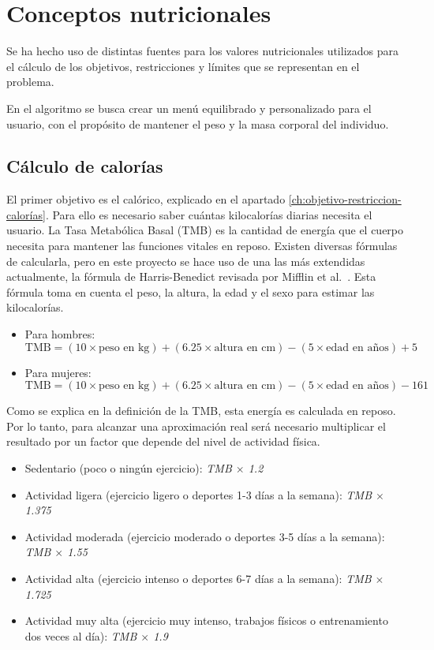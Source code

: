 \section{Conceptos nutricionales}

Se ha hecho uso de distintas fuentes para los valores nutricionales utilizados para el cálculo de los objetivos, restricciones y límites que se representan en el problema.

En el algoritmo se busca crear un menú equilibrado y personalizado para el usuario, con el propósito de mantener el peso y la masa corporal del individuo.

\subsection{Cálculo de calorías}
\label{ch:calculo-calorías}

El primer objetivo es el calórico, explicado en el apartado \ref{ch:objetivo-restriccion-calorías}. Para ello es necesario saber cuántas kilocalorías diarias necesita el usuario. La Tasa Metabólica Basal (TMB) es la cantidad de energía que el cuerpo necesita para mantener las funciones vitales en reposo. Existen diversas fórmulas de calcularla, pero en este proyecto se hace uso de una las más extendidas actualmente, la fórmula de Harris-Benedict revisada por Mifflin et al.~\cite{mifflin1990}. Esta fórmula toma en cuenta el peso, la altura, la edad y el sexo para estimar las kilocalorías.

\begin{itemize}
    \item Para hombres:
    \[
    \text{TMB} = (10 \times \text{peso en kg}) + (6.25 \times \text{altura en cm}) - (5 \times \text{edad en años}) + 5
    \]
    \item Para mujeres:
    \[
    \text{TMB} = (10 \times \text{peso en kg}) + (6.25 \times \text{altura en cm}) - (5 \times \text{edad en años}) - 161
    \]
\end{itemize}

Como se explica en la definición de la TMB, esta energía es calculada en reposo. Por lo tanto, para alcanzar una aproximación real será necesario multiplicar el resultado por un factor que depende del nivel de actividad física.~\cite{krause2016}

\begin{itemize}
    \item Sedentario (poco o ningún ejercicio): \textit{TMB $\times$ 1.2}
    \item Actividad ligera (ejercicio ligero o deportes 1-3 días a la semana): \textit{TMB $\times$ 1.375}
    \item Actividad moderada (ejercicio moderado o deportes 3-5 días a la semana): \textit{TMB $\times$ 1.55}
    \item Actividad alta (ejercicio intenso o deportes 6-7 días a la semana): \textit{TMB $\times$ 1.725}
    \item Actividad muy alta (ejercicio muy intenso, trabajos físicos o entrenamiento dos veces al día): \textit{TMB $\times$ 1.9}
\end{itemize}

